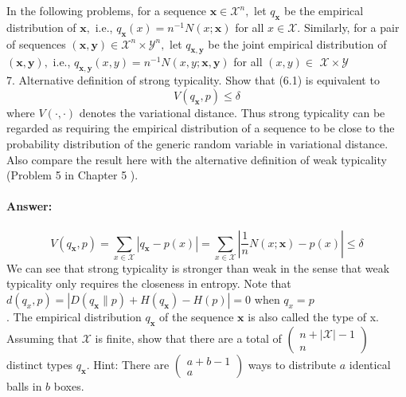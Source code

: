 \documentclass[8pt]{article}
\begin{document}
\vspace{10pt}
In the following problems, for a sequence $\mathbf{x} \in \mathcal{X}^{n},$ let $q_{\mathbf{x}}$ be the empirical distribution of $\mathbf{x},$ i.e., $q_{\mathbf{x}}(x)=n^{-1} N(x ; \mathbf{x})$ for all $x \in \mathcal{X}$. Similarly, for a pair of sequences $(\mathbf{x}, \mathbf{y}) \in \mathcal{X}^{n} \times \mathcal{Y}^{n},$ let $q_{\mathbf{x}, \mathbf{y}}$ be the joint empirical distribution of $(\mathbf{x}, \mathbf{y}),$ i.e., $q_{\mathbf{x}, \mathbf{y}}(x, y)=n^{-1} N(x, y ; \mathbf{x}, \mathbf{y})$ for all $(x, y) \in$
$\mathcal{X} \times \mathcal{Y}$\\
\vspace{10pt}
7. Alternative definition of strong typicality. Show that (6.1) is equivalent to
$$
V\left(q_{\mathbf{x}}, p\right) \leq \delta
$$
where $V(\cdot, \cdot)$ denotes the variational distance. Thus strong typicality can be regarded as requiring the empirical distribution of a sequence to be close to the probability distribution of the generic random variable in variational distance. Also compare the result here with the alternative definition of weak typicality (Problem 5 in Chapter 5 ).

\paragraph{Answer:}
$$
V\left(q_{\mathbf{x}}, p\right)=
\sum_{x \in \mathcal{X}}\left| q_{\mathbf{x}} -p(x)\right| = 
\sum_{x \in \mathcal{X}}\left|\frac{1}{n} N(x ; \mathbf{x})-p(x)\right|  \leq \delta
$$
We can see that strong typicality is stronger than weak in the sense that weak typicality only requires the closeness in entropy. Note that $ d(q_x, p) = 
\left|D\left(q_{\mathbf{x}} \| p\right)+H\left(q_{\mathbf{x}}\right)-H(p)\right| = 0 
$ when $q_x = p$ \\
\vspace{10pt}
. The empirical distribution $q_{\mathbf{x}}$ of the sequence $\mathbf{x}$ is also called the type of
x. Assuming that $\mathcal{X}$ is finite, show that there are a total of $\left(\begin{array}{c}n+|\mathcal{X}|-1 \\ n\end{array}\right)$ distinct types $q_{\mathbf{x}} .$ Hint: There are $\left(\begin{array}{c}a+b-1 \\ a\end{array}\right)$ ways to distribute $a$ identical balls in $b$ boxes.
\end{document}
